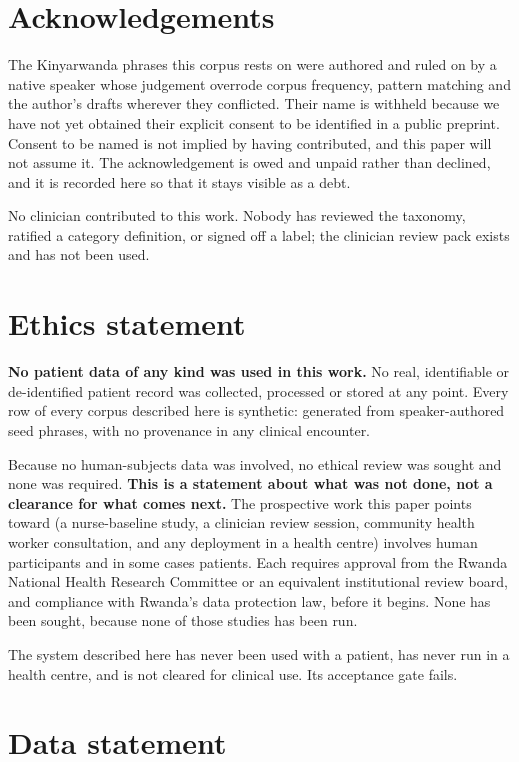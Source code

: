 \section*{Acknowledgements}
\label{sec:ack}

The Kinyarwanda phrases this corpus rests on were authored and ruled on by a
native speaker whose judgement overrode corpus frequency, pattern matching and
the author's drafts wherever they conflicted. Their name is withheld because we
have not yet obtained their explicit consent to be identified in a public
preprint. Consent to be named is not implied by having contributed, and this
paper will not assume it. The acknowledgement is owed and unpaid rather than
declined, and it is recorded here so that it stays visible as a debt.

No clinician contributed to this work. Nobody has reviewed the taxonomy, ratified
a category definition, or signed off a label; the clinician review pack exists
and has not been used.

\section*{Ethics statement}
\label{sec:ethics}

\textbf{No patient data of any kind was used in this work.} No real, identifiable
or de-identified patient record was collected, processed or stored at any point.
Every row of every corpus described here is synthetic: generated from
speaker-authored seed phrases, with no provenance in any clinical encounter.

Because no human-subjects data was involved, no ethical review was sought and
none was required. \textbf{This is a statement about what was not done, not a
clearance for what comes next.} The prospective work this paper points toward (a
nurse-baseline study, a clinician review session, community health worker
consultation, and any deployment in a health centre) involves human
participants and in some cases patients. Each requires approval from the Rwanda
National Health Research Committee or an equivalent institutional review board,
and compliance with Rwanda's data protection law, before it begins. None has
been sought, because none of those studies has been run.

The system described here has never been used with a patient, has never run in a
health centre, and is not cleared for clinical use. Its acceptance gate fails.

\section*{Data statement}
\label{sec:data}

